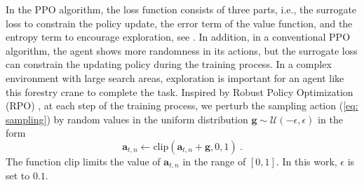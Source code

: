 In the PPO algorithm, the loss function consists of three parts, i.e., the surrogate loss to constrain the policy update, the error term of the value function, and the entropy term to encourage exploration, see \cite{weng2018policy}. 
In addition, in a conventional PPO algorithm, the agent shows more randomness in its actions, but the surrogate loss can constrain the updating policy during the training process. 
In a complex environment with large search areas, exploration is important for an agent like this forestry crane to complete the task. 
Inspired by Robust Policy Optimization (RPO) \cite{huang2022cleanrl}, at each step of the training process, we perturb the sampling action (\ref{eq: sampling}) by random values in the uniform distribution $\mathbf{g} \sim \mathcal{U(-\epsilon,\epsilon)}$ in the form
\begin{equation}
    \mathbf{a}_{t,n} \leftarrow \mathrm{clip}(\mathbf{a}_{t,n} + \mathbf{g},0,1) \:.
    \label{eq: robust ppo}
\end{equation}
The function $\mathrm{clip}$ limits the value of $\mathbf{a}_{t,n}$ in the range of $[0,1]$. In this work, $\epsilon$ is set to $0.1$. 

 